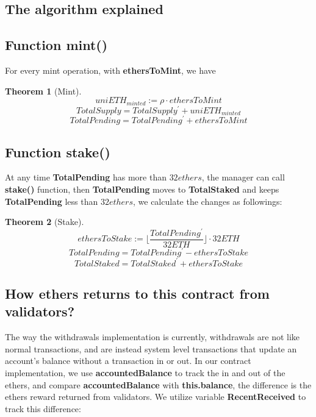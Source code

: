 \documentclass{article}
\begin{document}
\subsection{The algorithm explained}
\newtheorem{theorem}{Theorem}[section]
\newtheorem{corollary}{Corollary}[theorem]
\newtheorem{lemma}[theorem]{Lemma}

\subsection{Function mint()}
For every mint operation, with \textbf{ethersToMint}, we have 

\begin{theorem}[Mint]
\label{Mint}
\[uniETH_{minted} := \rho \cdot ethersToMint \]
\[TotalSupply = TotalSupply^{\prime} + uniETH_{minted} \]
\[TotalPending = TotalPending^{\prime} + ethersToMint\]
\end{theorem}

\subsection{Function stake()}
At any time \textbf{TotalPending} has more than $32 ethers$, the manager can call \textbf{stake()} function, then \textbf{TotalPending} moves to \textbf{TotalStaked} and keeps \textbf{TotalPending} less than $32 ethers$, we calculate the changes as followings:
\begin{theorem}[Stake]
\label{Stake}
\[ethersToStake := \lfloor\frac{TotalPending^{\prime}}{32ETH}\rfloor \cdot 32ETH\]
\[TotalPending = TotalPending^{\prime} - ethersToStake \]
\[TotalStaked = TotalStaked^{\prime} + ethersToStake \]
\end{theorem}

\subsection{How ethers returns to this contract from validators? }
\label{sectionAccounting}

The way the withdrawals implementation is currently, withdrawals are not like normal transactions, and are instead system level transactions that update an account's balance without a transaction in or out. In our contract implementation, we use \textbf{accountedBalance} to track the in and out of the ethers, and compare \textbf{accountedBalance} with \textbf{this.balance}, the difference is the ethers reward returned from validators. We utilize variable \textbf{RecentReceived} to track this difference:
\end{document}
